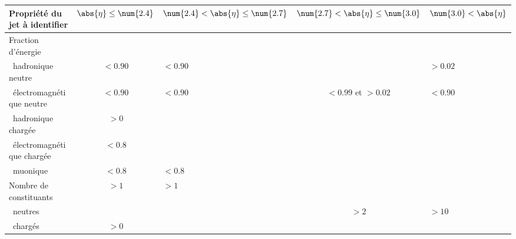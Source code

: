 \begin{tabularx}{\textwidth}{lcYcY}
\toprule
Propriété du jet à identifier & $\abs{\eta}\leq\num{2.4}$ & $\num{2.4}<\abs{\eta}\leq\num{2.7}$ & $\num{2.7}<\abs{\eta}\leq\num{3.0}$ & $\num{3.0}<\abs{\eta}$ \\
\midrule
Fraction d'énergie\\
\ hadronique neutre & $<\num{0.90}$ & $<\num{0.90}$ &  & $>\num{0.02}$ \\
\ électromagnétique neutre & $<\num{0.90}$ & $<\num{0.90}$ & $<\num{0.99}$ et $>\num{0.02}$ & $<\num{0.90}$ \\
\ hadronique chargée & $>\num{0}$ &&&\\
\ électromagnétique chargée & $<\num{0.8}$ \\
\ muonique & $<\num{0.8}$ & $<\num{0.8}$ \\
\midrule
Nombre de constituants & $>\num{1}$ & $>\num{1}$\\
\ neutres & & & $>\num{2}$ & $>\num{10}$ \\
\ chargés & $>\num{0}$ &&&\\
\bottomrule
\end{tabularx}

